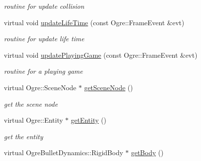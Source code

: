 \begin{DoxyCompactItemize}
\begin{DoxyCompactList}\small\item\em routine for update collision \end{DoxyCompactList}\item 
virtual void \hyperlink{class_n_c_t_u_1_1_obstacle_a45e169430ef20b5ee475f48ca3fc502a}{update\+Life\+Time} (const Ogre\+::\+Frame\+Event \&evt)\hypertarget{class_n_c_t_u_1_1_obstacle_a45e169430ef20b5ee475f48ca3fc502a}{}\label{class_n_c_t_u_1_1_obstacle_a45e169430ef20b5ee475f48ca3fc502a}

\begin{DoxyCompactList}\small\item\em routine for update life time \end{DoxyCompactList}\item 
virtual void \hyperlink{class_n_c_t_u_1_1_obstacle_a232a6f9974ec04ae5ffb1f618f7c6bec}{update\+Playing\+Game} (const Ogre\+::\+Frame\+Event \&evt)\hypertarget{class_n_c_t_u_1_1_obstacle_a232a6f9974ec04ae5ffb1f618f7c6bec}{}\label{class_n_c_t_u_1_1_obstacle_a232a6f9974ec04ae5ffb1f618f7c6bec}

\begin{DoxyCompactList}\small\item\em routine for a playing game \end{DoxyCompactList}\item 
virtual Ogre\+::\+Scene\+Node $\ast$ \hyperlink{class_n_c_t_u_1_1_obstacle_a79f8cc36edef15a3639a40c70acdb53f}{get\+Scene\+Node} ()\hypertarget{class_n_c_t_u_1_1_obstacle_a79f8cc36edef15a3639a40c70acdb53f}{}\label{class_n_c_t_u_1_1_obstacle_a79f8cc36edef15a3639a40c70acdb53f}

\begin{DoxyCompactList}\small\item\em get the scene node \end{DoxyCompactList}\item 
virtual Ogre\+::\+Entity $\ast$ \hyperlink{class_n_c_t_u_1_1_obstacle_ab0b495eb1f91ab76faa751751e3639e7}{get\+Entity} ()\hypertarget{class_n_c_t_u_1_1_obstacle_ab0b495eb1f91ab76faa751751e3639e7}{}\label{class_n_c_t_u_1_1_obstacle_ab0b495eb1f91ab76faa751751e3639e7}

\begin{DoxyCompactList}\small\item\em get the entity \end{DoxyCompactList}\item 
virtual Ogre\+Bullet\+Dynamics\+::\+Rigid\+Body $\ast$ \hyperlink{class_n_c_t_u_1_1_obstacle_aab79cadcfa31f7a6633e4a79df6683ee}{get\+Body} ()\hypertarget{class_n_c_t_u_1_1_obstacle_aab79cadcfa31f7a6633e4a79df6683ee}{}\label{class_n_c_t_u_1_1_obstacle_aab79cadcfa31f7a6633e4a79df6683ee}


\end{DoxyCompactItemize}
